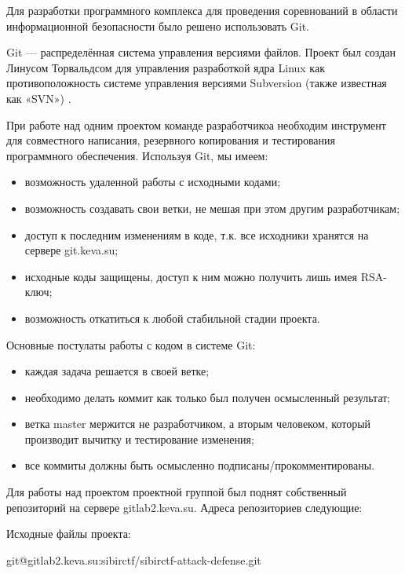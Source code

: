Для разработки программного комплекса для проведения соревнований в области информационной безопасности было решено использовать Git.

Git --- распределённая система управления версиями файлов. Проект был создан Линусом Торвальдсом для управления разработкой ядра Linux  как противоположность  системе управления версиями Subversion (также известная как «SVN») \cite{progit}.

При работе над одним проектом команде разработчикоа необходим инструмент для совместного написания, резервного копирования и тестирования программного обеспечения. Используя Git, мы имеем:
\begin{itemize}
\item возможность удаленной работы с исходными кодами;
\item возможность создавать свои ветки, не мешая при этом другим разработчикам;
\item доступ к последним изменениям в коде, т.к. все исходники хранятся на сервере git.keva.su;
\item исходные коды защищены, доступ к ним можно получить лишь имея RSA-ключ;
\item возможность откатиться к любой стабильной стадии проекта.
\end{itemize}

Основные постулаты работы с кодом в системе Git:

\begin{itemize}
\item каждая задача решается в своей ветке;
\item необходимо делать коммит как только был получен осмысленный результат;
\item ветка master мержится не разработчиком, а вторым человеком, который производит вычитку и тестирование изменения;
\item все коммиты должны быть осмысленно подписаны/прокомментированы.
\end{itemize}

Для работы над проектом проектной группой был поднят собственный репозиторий на сервере gitlab2.keva.su.
Адреса репозиториев следующие:

Исходные файлы проекта:

git@gitlab2.keva.su:sibirctf/sibirctf-attack-defense.git
